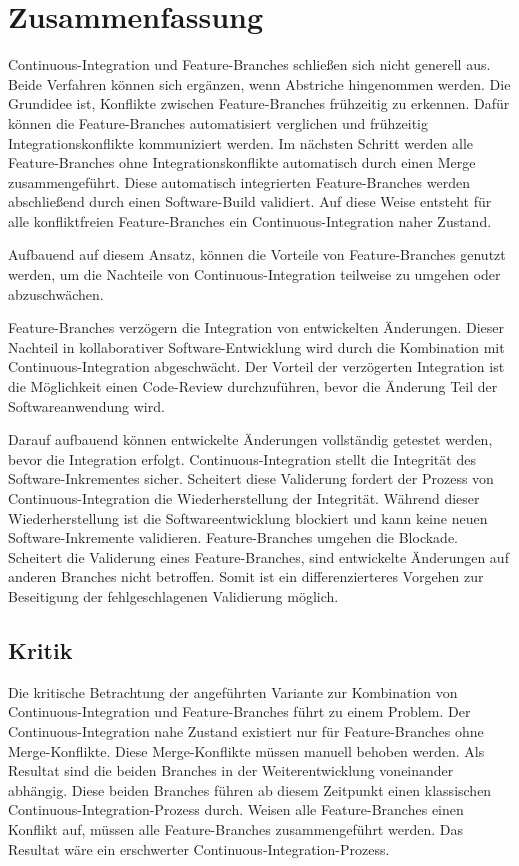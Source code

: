 \chapter{Zusammenfassung}

Continuous-Integration und Feature-Branches schließen sich nicht generell aus. Beide Verfahren können sich ergänzen, wenn Abstriche hingenommen werden. Die Grundidee ist, Konflikte zwischen Feature-Branches frühzeitig zu erkennen. Dafür können die Feature-Branches automatisiert verglichen und frühzeitig Integrationskonflikte kommuniziert werden. Im nächsten Schritt werden alle Feature-Branches ohne Integrationskonflikte automatisch durch einen Merge zusammengeführt. Diese automatisch integrierten Feature-Branches werden abschließend durch einen Software-Build validiert. Auf diese Weise entsteht für alle konfliktfreien Feature-Branches ein Continuous-Integration naher Zustand.

Aufbauend auf diesem Ansatz, können die Vorteile von Feature-Branches genutzt werden, um die Nachteile von Continuous-Integration teilweise zu umgehen oder abzuschwächen.

Feature-Branches verzögern die Integration von entwickelten Änderungen. Dieser Nachteil in kollaborativer Software-Entwicklung wird durch die Kombination mit Continuous-Integration abgeschwächt. Der Vorteil der verzögerten Integration ist die Möglichkeit einen Code-Review durchzuführen, bevor die Änderung Teil der Softwareanwendung wird. 

Darauf aufbauend können entwickelte Änderungen vollständig getestet werden, bevor die Integration erfolgt. Continuous-Integration stellt die Integrität des Software-Inkrementes sicher. Scheitert diese Validerung fordert der Prozess von Continuous-Integration die Wiederherstellung der Integrität. Während dieser Wiederherstellung ist die Softwareentwicklung blockiert und kann keine neuen Software-Inkremente validieren. Feature-Branches umgehen die Blockade. Scheitert die Validerung eines Feature-Branches, sind entwickelte Änderungen auf anderen Branches nicht betroffen. Somit ist ein differenzierteres Vorgehen zur Beseitigung der fehlgeschlagenen Validierung möglich.

\section{Kritik}

Die kritische Betrachtung der angeführten Variante zur Kombination von Continuous\hyp{}Integration und Feature-Branches führt zu einem Problem. Der Continuous-Integration nahe Zustand existiert nur für Feature-Branches ohne Merge-Konflikte. Diese Merge-Konflikte müssen manuell behoben werden. Als Resultat sind die beiden Branches in der Weiterentwicklung voneinander abhängig. Diese beiden Branches führen ab diesem Zeitpunkt einen \glqq klassischen\grqq{} Continuous-Integration-Prozess durch. Weisen alle Feature-Branches einen Konflikt auf, müssen alle Feature-Branches zusammengeführt werden. Das Resultat wäre ein \glqq erschwerter\grqq{} Continuous-Integration-Prozess.

